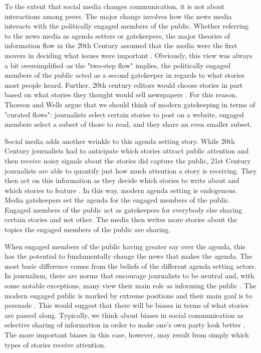 \documentclass[12pt]{article}
\begin{document}
\begin{doublespace}
To the extent that social media changes communication, it is not about interactions among peers. The major change involves how the news media interacts with the politically engaged members of the public. Whether referring to the news media as agenda setters or gatekeepers, the major theories of information flow in the 20th Century assumed that the media were the first movers in deciding what issues were important \citep{IyengarKinder1987}. Obviously, this view was always a bit oversimplified--as the "two-step flow" implies, the politically engaged members of the public acted as a second gatekeeper in regards to what stories most people heard. Further, 20th century editors would choose stories in part based on what stories they thought would sell newspapers \citep{Napoli1997}. For this reason, Thorson and Wells \citeyearpar{ThorsonWells2015} argue that we should think of modern gatekeeping in terms of "curated flows": journalists select certain stories to post on a website, engaged members select a subset of those to read, and they share an even smaller subset.

Social media adds another wrinkle to this agenda setting story. While 20th Century journalists had to anticipate which stories attract public attention and then receive noisy signals about the stories did capture the public, 21st Century journalists are able to quantify just how much attention a story is receiving. They then act on this information as they decide which stories to write about and which stories to feature \citep{TandocVosND}. In this way, modern agenda setting is endogenous. Media gatekeepers set the agenda for the engaged members of the public. Engaged members of the public act as gatekeepers for everybody else sharing certain stories and not other. The media then writes more stories about the topics the engaged members of the public are sharing.

When engaged members of the public having greater say over the agenda, this has the potential to fundamentally change the news that makes the agenda. The most basic difference comes from the beliefs of the different agenda setting actors. In journalism, there are norms that encourage journalists to be neutral and, with some notable exceptions, many view their main role as informing the public \citep{Bennett1996}. The modern engaged public is marked by extreme positions \citep{Abramowitz2010} and their main goal is to persuade \citep{AhnHuckfeldtRyan2014}. This would suggest that there will be biases in terms of what stories are passed along. Typically, we think about biases in social communication as selective sharing of information in order to make one's own party look better \citep{AhnRyan2015,PietrykaND}. The more important biases in this case, however, may result from simply which types of stories receive attention.


\end{doublespace}
\end{document}
